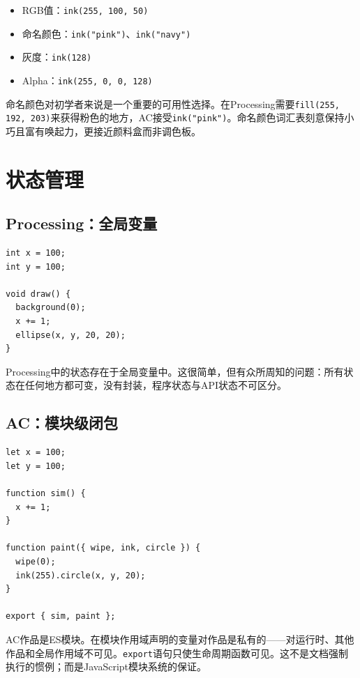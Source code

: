 \documentclass[10pt,letterpaper,twocolumn]{article}
\begin{document}
\begin{itemize}
  \item RGB值：\texttt{ink(255, 100, 50)}
  \item 命名颜色：\texttt{ink("pink")}、\texttt{ink("navy")}
  \item 灰度：\texttt{ink(128)}
  \item Alpha：\texttt{ink(255, 0, 0, 128)}
\end{itemize}

命名颜色对初学者来说是一个重要的可用性选择。在Processing需要\texttt{fill(255, 192, 203)}来获得粉色的地方，AC接受\texttt{ink("pink")}。命名颜色词汇表刻意保持小巧且富有唤起力，更接近颜料盒而非调色板。


\section{状态管理}
\label{sec:state}

\subsection{Processing：全局变量}

\begin{lstlisting}[style=processingstyle]
int x = 100;
int y = 100;

void draw() {
  background(0);
  x += 1;
  ellipse(x, y, 20, 20);
}
\end{lstlisting}

Processing中的状态存在于全局变量中。这很简单，但有众所周知的问题：所有状态在任何地方都可变，没有封装，程序状态与API状态不可区分。

\subsection{AC：模块级闭包}

\begin{lstlisting}[style=acjsstyle]
let x = 100;
let y = 100;

function sim() {
  x += 1;
}

function paint({ wipe, ink, circle }) {
  wipe(0);
  ink(255).circle(x, y, 20);
}

export { sim, paint };
\end{lstlisting}

AC作品是ES模块。在模块作用域声明的变量对作品是私有的——对运行时、其他作品和全局作用域不可见。\texttt{export}语句只使生命周期函数可见。这不是文档强制执行的惯例；而是JavaScript模块系统的保证。
\end{document}
